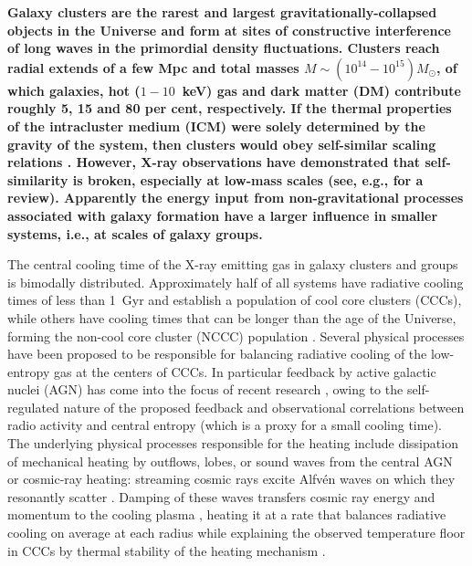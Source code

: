 \documentclass[useAMS,usenatbib]{mn2e}
\begin{document}
{\bf Galaxy clusters are the rarest and largest gravitationally-collapsed
  objects in the Universe and form at sites of constructive interference of long
  waves in the primordial density fluctuations. Clusters reach radial extends of
  a few Mpc and total masses $M \sim (10^{14} - 10^{15}) M_{\odot}$, of which
  galaxies, hot ($1-10$~keV) gas and dark matter (DM) contribute roughly 5, 15
  and 80 per cent, respectively. If the thermal properties of the intracluster medium
  (ICM) were solely determined by the gravity of the system, then clusters would
  obey self-similar scaling relations \citep{1986MNRAS.222..323K}.  However,
  X-ray observations have demonstrated that self-similarity is broken,
  especially at low-mass scales (see, e.g., \citealp{2005RvMP...77..207V} for a
  review). Apparently the energy input from non-gravitational processes
  associated with galaxy formation have a larger influence in smaller systems,
  i.e., at scales of galaxy groups.

  The central cooling time of the X-ray emitting gas in galaxy clusters and
  groups is bimodally distributed. Approximately half of all systems have
  radiative cooling times of less than 1~Gyr and establish a population of cool
  core clusters (CCCs), while others have cooling times that can be longer than
  the age of the Universe, forming the non-cool core cluster (NCCC) population
  \citep{2009ApJS..182...12C,2010A&A...513A..37H}. Several physical processes
  have been proposed to be responsible for balancing radiative cooling of the
  low-entropy gas at the centers of CCCs. In particular feedback by active
  galactic nuclei (AGN) has come into the focus of recent research
  \citep{2007ARA&A..45..117M, 2012NJPh...14e5023M}, owing to the self-regulated
  nature of the proposed feedback and observational correlations between radio
  activity and central entropy (which is a proxy for a small cooling time). The
  underlying physical processes responsible for the heating include dissipation
  of mechanical heating by outflows, lobes, or sound waves from the central AGN
  \citep[e.g.,][]{2001ApJ...554..261C, 2002Natur.418..301B, 2002ApJ...581..223R,
    2012MNRAS.424..190G} or cosmic-ray heating: streaming cosmic rays excite
  Alfv\'en waves on which they resonantly scatter \citep{1969ApJ...156..445K}.
  Damping of these waves transfers cosmic ray energy and momentum to the cooling
  plasma \citep{1991ApJ...377..392L, 2008MNRAS.384..251G, 2011A&A...527A..99E,
    2013MNRAS.434.2209W}, heating it at a rate that balances radiative cooling
  on average at each radius while explaining the observed temperature floor in
  CCCs by thermal stability of the heating mechanism
  \citep{2013arXiv1303.5443P}.

}
\end{document}
